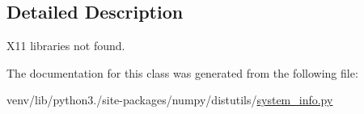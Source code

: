 \subsection{Detailed Description}
\begin{DoxyVerb}X11 libraries not found.\end{DoxyVerb}
 

The documentation for this class was generated from the following file\+:\begin{DoxyCompactItemize}
\item 
venv/lib/python3./site-\/packages/numpy/distutils/\hyperlink{system__info_8py}{system\+\_\+info.\+py}\end{DoxyCompactItemize}
